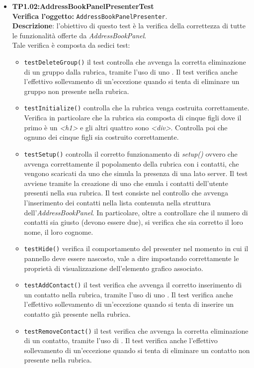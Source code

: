 \begin{itemize}
\item \textbf{TP1.02:AddressBookPanelPresenterTest}\\
\textbf{Verifica l'oggetto:} \texttt{AddressBookPanelPresenter}.\\
\textbf{Descrizione}: l'obiettivo di questo test è la verifica della correttezza di tutte le funzionalità offerte da \textit{AddressBookPanel}.\\
Tale verifica è composta da sedici test:
\begin{itemize}
\item \texttt{testDeleteGroup()} il test controlla che avvenga la corretta eliminazione di un gruppo dalla rubrica, tramite l'uso di uno . Il test verifica anche l'effettivo sollevamento di un'eccezione quando si tenta di eliminare un gruppo non presente nella rubrica.
\item \texttt{testInitialize()} controlla che la rubrica venga costruita correttamente. Verifica in particolare che la rubrica sia composta di cinque figli dove il primo è un \textit{<h1>} e gli altri quattro sono \textit{<div>}. Controlla poi che ognuno dei cinque figli sia costruito correttamente. 
\item \texttt{testSetup()} controlla il corretto funzionamento di \textit{setup()} ovvero che avvenga correttamente il popolamento della rubrica con i contatti, che vengono scaricati da uno  che simula la presenza di una  lato server. 
Il test avviene tramite la creazione di uno  che emula i contatti dell'utente presenti nella sua rubrica. 
Il test consiste nel controllo che avvenga l'inserimento dei contatti nella lista contenuta nella struttura dell'\textit{AddressBookPanel}. In particolare, oltre a controllare che il numero di contatti sia giusto (devono essere due), si verifica che sia corretto il loro nome, il loro cognome.
\item \texttt{testHide()} verifica il comportamento del presenter nel momento in cui il pannello deve essere nascosto, vale a dire impostando correttamente le proprietà di visualizzazione dell'elemento grafico associato.
\item \texttt{testAddContact()} il test verifica che avvenga il corretto inserimento di un contatto nella rubrica, tramite l'uso di uno . Il test verifica anche l'effettivo sollevamento di un'eccezione quando si tenta di inserire un contatto già presente nella rubrica.
\item \texttt{testRemoveContact()} il test verifica che avvenga la corretta eliminazione di un contatto, tramite l'uso di . Il test verifica anche l'effettivo sollevamento di un'eccezione quando si tenta di eliminare un contatto non presente nella rubrica.

\end{itemize}
\end{itemize}
